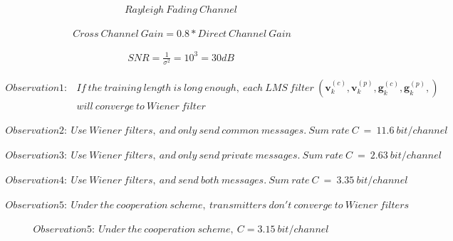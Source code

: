 \documentclass[11pt, oneside]{article}   	%
\begin{document}
\begin{align*}
Rayleigh\ Fading\ Channel
\end{align*}

\begin{align*}
\ Cross\ Channel\ Gain = 0.8*Direct\ Channel\ Gain
\end{align*}

\begin{align*}
SNR = \frac {1}{\sigma^2} = 10^3=30dB
\end{align*}

\begin{align*}
Observation1: &If\ the\ training\ length\ is\ long\ enough,\ each\ LMS\ filter\ (\textbf{v}^{(c)}_{k},\textbf{v}^{(p)}_{k},\textbf{g}^{(c)}_{k},\textbf{g}^{(p)}_{k},)\\
&will\ converge\ to\ Wiener\ filter
\end{align*}

\begin{align*}
Observation2:\ Use\ Wiener\ filters,\ and\ only\ send\ common\ messages.\ Sum\ rate\ C\ =\ 11.6\ bit/channel
\end{align*}

\begin{align*}
Observation3:\ Use\ Wiener\ filters,\ and\ only\ send\ private\ messages.\ Sum\ rate\ C\ =\ 2.63\ bit/channel
\end{align*}

\begin{align*}
Observation4:\ Use\ Wiener\ filters,\ and\  send\ both\ messages.\ Sum\ rate\ C\ =\ 3.35\ bit/channel
\end{align*}

\begin{align*}
Observation5:\ Under\ the\ cooperation\ scheme,\ transmitters\ don't\ converge\ to\ Wiener\ filters 
\end{align*}

\begin{align*}
Observation5:\ Under\ the\ cooperation\ scheme,\ C=3.15\ bit/channel
\end{align*}
\end{document}
